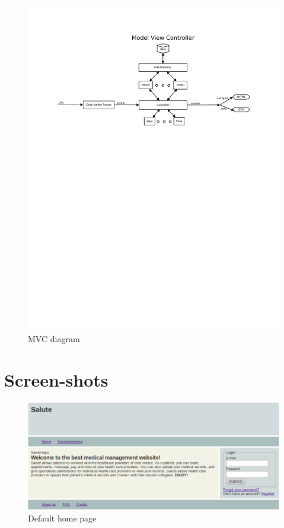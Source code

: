 \documentclass[10pt]{report}
\begin{document}
\begin{figure}
\centering
\includegraphics[scale=0.7]{mvc.pdf}
\caption{MVC diagram}
\end{figure}

\chapter{Screen-shots}
\begin{figure}
\includegraphics[scale=0.4]{screenshots/Default.png}
\caption{Default home page}
\end{figure}
\end{document}
